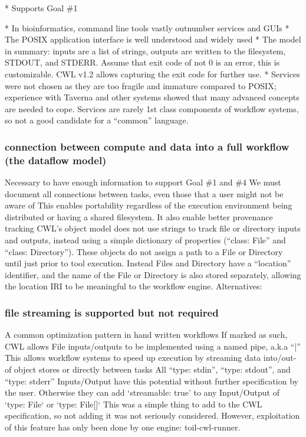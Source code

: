 * Supports Goal \#1

* In bioinformatics, command line tools vastly outnumber services and GUIs
* The POSIX application interface is well understood and widely used
* The model in summary: inputs are a list of strings, outputs are written to the filesystem, STDOUT, and STDERR. Assume that exit code of not 0 is an error, this is customizable. CWL v1.2 allows capturing the exit code for further use.
* Services were not chosen as they are too fragile and immature compared to POSIX; experience with Taverna and other systems showed that many advanced concepts are needed to cope. Services are rarely 1st class components of workflow systems, so not a good candidate for a “common” language.

\subsubsection{connection between compute and data into a full workflow (the dataflow model)}
Necessary to have enough information to support Goal \#1 and \#4
We must document all connections between tasks, even those that a user might not be aware of
This enables portability regardless of the execution environment being  distributed or having a shared filesystem. It also enable better provenance tracking
CWL’s object model does not use strings to track file or directory inputs and outputs, instead using a simple dictionary of properties (“class: File” and “class: Directory”). These objects do not assign a path to a File or Directory until just prior to tool execution. Instead Files and Directory have a “location” identifier, and the name of the File or Directory is also stored separately, allowing the location IRI to be meaningful to the workflow engine.
Alternatives:

\subsubsection{file streaming is supported but not required}
A common optimization pattern in hand written workflows
If marked as such, CWL allows File inputs/outputs to be implemented using a named pipe, a.k.a “|”
This allows workflow systems to speed up execution by streaming data into/out-of object stores or directly between tasks
All “type: stdin”, “type: stdout”, and “type: stderr” Inputs/Output have this potential without further specification by the user. Otherwise they can add `streamable: true’ to any Input/Output of `type: File` or `type: File[]`
This was a simple thing to add to the CWL specification, so not adding it was not seriously considered. However, exploitation of this feature has only been done by one engine: toil-cwl-runner.

